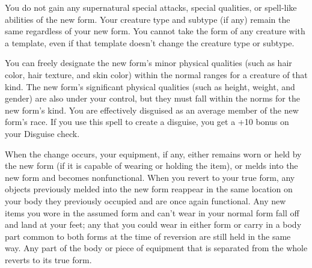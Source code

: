 You do not gain any supernatural special attacks, special qualities, or spell-like 
abilities of the new form. Your creature type and subtype (if any) remain the same 
regardless of your new form. You cannot take the form of any creature with a template, 
even if that template doesn't change the creature type or subtype.

You can freely designate the new form's minor physical qualities (such as hair 
color, hair texture, and skin color) within the normal ranges for a creature of 
that kind. The new form's significant physical qualities (such as height, weight, 
and gender) are also under your control, but they must fall within the norms for 
the new form's kind. You are effectively disguised as an average member of the 
new form's race. If you use this spell to create a disguise, you get a +10 bonus 
on your Disguise check.

When the change occurs, your equipment, if any, either remains worn or held by 
the new form (if it is capable of wearing or holding the item), or melds into the 
new form and becomes nonfunctional. When you revert to your true form, any objects 
previously melded into the new form reappear in the same location on your body 
they previously occupied and are once again functional. Any new items you wore 
in the assumed form and can't wear in your normal form fall off and land at your 
feet; any that you could wear in either form or carry in a body part common to 
both forms at the time of reversion are still held in the same way. Any part of 
the body or piece of equipment that is separated from the whole reverts to its 
true form.

